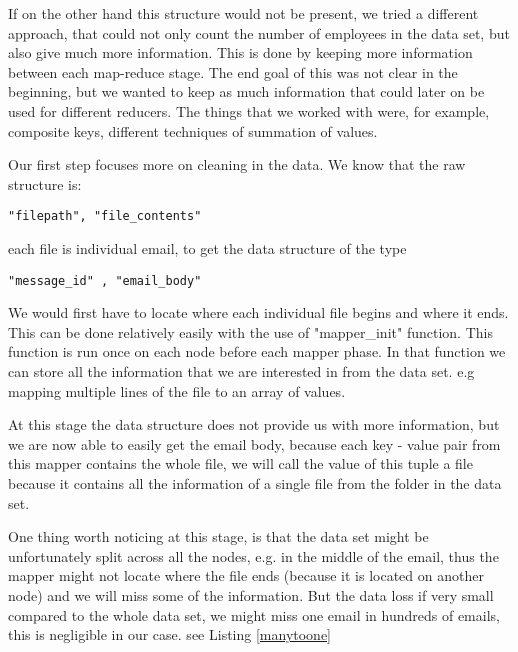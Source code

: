 \documentclass{llncs}
\begin{document}
If on the other hand this structure would not be present, we tried a different approach, that could not only count the number of employees in the data set, but also give much more information. This is done by keeping more information between each map-reduce stage. The end goal of this was not clear in the beginning, but we wanted to keep as much information that could later on be used for different reducers. The things that we worked with were, for example, composite keys, different techniques of summation of values.

Our first step focuses more on cleaning in the data. We know that the raw structure is:

\begin{lstlisting}
"filepath", "file_contents"
\end{lstlisting}

each file is individual email, to get the data structure of the type
\begin{lstlisting}
"message_id" , "email_body"
\end{lstlisting}

We would first have to locate where each individual file begins and where it ends. This can be done relatively easily with the use of "mapper\_init" function. This function is run once on each node before each mapper phase. In that function we can store all the information that we are interested in from the data set. e.g mapping multiple lines of the file to an array of values.

At this stage the data structure does not provide us with more information, but we are now able to easily get the email body, because each key - value pair from this mapper contains the whole file, we will call the value of this tuple a file because it contains all the information of a single file from the folder in the data set.

One thing worth noticing at this stage, is that the data set might be unfortunately split across all the nodes, e.g. in the middle of the email, thus the mapper might not locate where the file ends (because it is located on another node) and we will miss some of the information. But the data loss if very small compared to the whole data set, we might miss one email in hundreds of emails, this is negligible in our case. see Listing \ref{manytoone}
\end{document}
